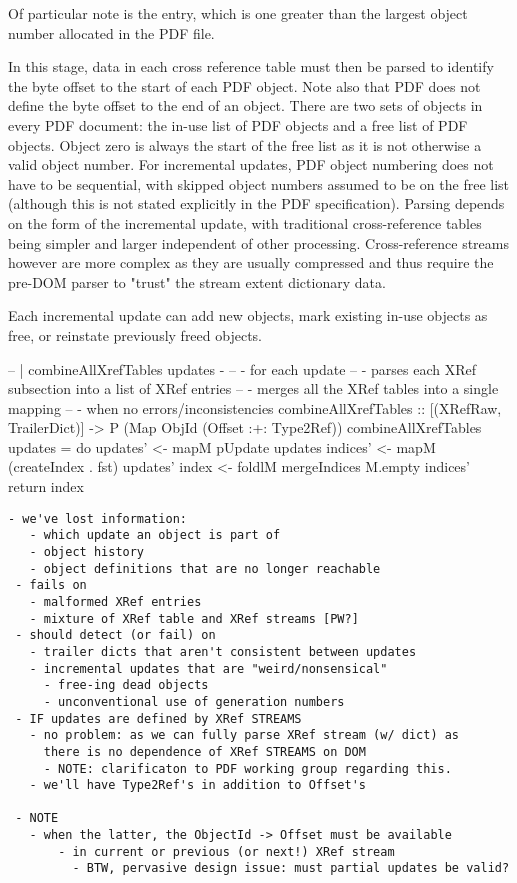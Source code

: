 Of particular note is the  entry, which
is one greater than the largest object number allocated in the PDF
file.

In this stage, data in each cross reference table must then be parsed to
identify the byte offset to the start of each PDF object. Note also that PDF
does not define the byte offset to the end of an object. There are two sets of
objects in every PDF document: the in-use list of PDF objects and a free list
of PDF objects. Object zero is always the start of the free list as it is not
otherwise a valid object number. For incremental updates, PDF object numbering
does not have to be sequential, with skipped object numbers assumed to be on
the free list (although this is not stated explicitly in the PDF
specification). Parsing depends on the form of the incremental update, with
traditional cross-reference tables being simpler and larger independent of
other processing. Cross-reference streams however are more complex as they are
usually compressed and thus require the pre-DOM parser to "trust" the stream
extent dictionary data.

Each incremental update can add new objects, mark existing in-use objects as
free, or reinstate previously freed objects.

\begin{code}
-- | combineAllXrefTables updates - 
--   - for each update
--     - parses each XRef subsection into a list of XRef entries
--   - merges all the XRef tables into a single mapping
--     - when no errors/inconsistencies
combineAllXrefTables
  :: [(XRefRaw, TrailerDict)] -> P (Map ObjId (Offset :+: Type2Ref))
combineAllXrefTables updates =
  do
  updates' <- mapM pUpdate updates  
  indices' <- mapM (createIndex . fst) updates' 
  index    <- foldlM mergeIndices M.empty indices'
  return index
\end{code}

\begin{lstlisting}[style=meta]
 - we've lost information:
   - which update an object is part of
   - object history
   - object definitions that are no longer reachable
 - fails on
   - malformed XRef entries
   - mixture of XRef table and XRef streams [PW?]
 - should detect (or fail) on
   - trailer dicts that aren't consistent between updates
   - incremental updates that are "weird/nonsensical"
     - free-ing dead objects
     - unconventional use of generation numbers
 - IF updates are defined by XRef STREAMS
   - no problem: as we can fully parse XRef stream (w/ dict) as
     there is no dependence of XRef STREAMS on DOM
     - NOTE: clarificaton to PDF working group regarding this.
   - we'll have Type2Ref's in addition to Offset's
      
 - NOTE 
   - when the latter, the ObjectId -> Offset must be available
       - in current or previous (or next!) XRef stream
         - BTW, pervasive design issue: must partial updates be valid?
\end{lstlisting}

